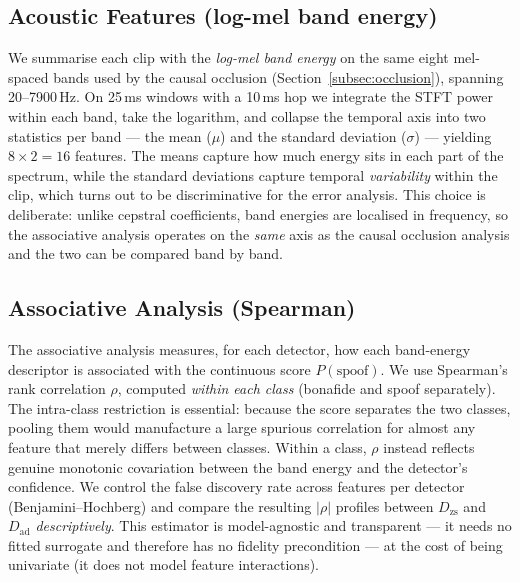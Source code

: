 \documentclass[sigconf]{acmart}
\begin{document}
\subsection{Acoustic Features (log-mel band energy)}
We summarise each clip with the \emph{log-mel band energy} on the same eight
mel-spaced bands used by the causal occlusion (Section~\ref{subsec:occlusion}),
spanning 20--7900\,Hz. On 25\,ms windows with a 10\,ms hop we integrate the STFT
power within each band, take the logarithm, and collapse the temporal axis into two
statistics per band --- the mean ($\mu$) and the standard deviation ($\sigma$) ---
yielding $8\times2=16$ features. The means capture how much energy sits in each part
of the spectrum, while the standard deviations capture temporal \emph{variability}
within the clip, which turns out to be discriminative for the error analysis. This
choice is deliberate: unlike cepstral coefficients, band energies are localised in
frequency, so the associative analysis operates on the \emph{same} axis as the
causal occlusion analysis and the two can be compared band by band.

\subsection{Associative Analysis (Spearman)}
\label{subsec:assoc}
The associative analysis measures, for each detector, how each band-energy
descriptor is associated with the continuous score $P(\mathrm{spoof})$. We use Spearman's rank
correlation $\rho$, computed \emph{within each class} (bonafide and spoof
separately). The intra-class restriction is essential: because the score separates
the two classes, pooling them would manufacture a large spurious correlation for
almost any feature that merely differs between classes. Within a class, $\rho$
instead reflects genuine monotonic covariation between the band energy and the
detector's confidence. We control the false discovery rate across features per
detector (Benjamini--Hochberg) and compare the resulting $|\rho|$ profiles between
$D_\mathrm{zs}$ and $D_\mathrm{ad}$ \emph{descriptively}. This estimator is
model-agnostic and transparent --- it needs no fitted surrogate and therefore has no
fidelity precondition --- at the cost of being univariate (it does not model feature
interactions).
\end{document}
